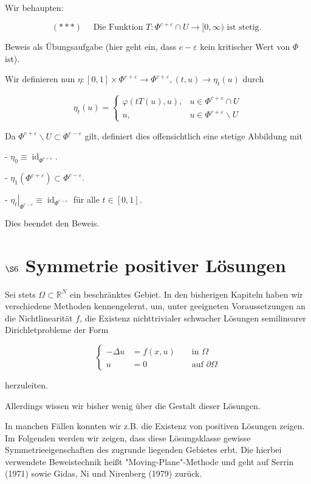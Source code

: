 \documentclass[10pt, letterpaper]{article}
\begin{document}
Wir behaupten:

$$
(* * *) \quad \text { Die Funktion } T: \Phi^{c+\varepsilon} \cap U \rightarrow[0, \infty) \text { ist stetig. }
$$

Beweis als Übungsaufgabe (hier geht ein, dass $c-\varepsilon$ kein kritischer Wert von $\Phi$ ist).

Wir definieren nun $\eta:[0,1] \times \Phi^{c+\varepsilon} \rightarrow \Phi^{c+\varepsilon},(t, u) \rightarrow \eta_{t}(u)$ durch

$$
\eta_{t}(u)= \begin{cases}\varphi(t T(u), u), & u \in \Phi^{c+\varepsilon} \cap U \\ u, & u \in \Phi^{c+\varepsilon} \backslash U\end{cases}
$$

Da $\Phi^{c+\varepsilon} \backslash U \subset \Phi^{c-\varepsilon}$ gilt, definiert dies offensichtlich eine stetige Abbildung mit

- $\eta_{0} \equiv \operatorname{id}_{\Phi^{c+\varepsilon}}$.

- $\eta_{1}\left(\Phi^{c+\varepsilon}\right) \subset \Phi^{c-\varepsilon}$.

- $\left.\eta_{t}\right|_{\Phi^{c-\varepsilon}} \equiv \operatorname{id}_{\Phi^{c-\varepsilon}}$ für alle $t \in[0,1]$.

Dies beendet den Beweis.

\section*{$\S 6$ Symmetrie positiver Lösungen}

Sei stets $\Omega \subset \mathbb{R}^{N}$ ein beschränktes Gebiet. In den bisherigen Kapiteln haben wir verschiedene Methoden kennengelernt, um, unter geeigneten Voraussetzungen an die Nichtlinearität $f$, die Existenz nichttrivialer schwacher Lösungen semilinearer Dirichletprobleme der Form

$$
\left\{\begin{aligned}
-\Delta u & =f(x, u) & & \text { in } \Omega \\
u & =0 & & \text { auf } \partial \Omega
\end{aligned}\right.
$$

herzuleiten.

Allerdings wissen wir bisher wenig über die Gestalt dieser Lösungen.

In manchen Fällen konnten wir z.B. die Existenz von positiven Lösungen zeigen. Im Folgenden werden wir zeigen, dass diese Lösungsklasse gewisse Symmetrieeigenschaften des zugrunde liegenden Gebietes erbt. Die hierbei verwendete Beweistechnik heißt "Moving-Plane"-Methode und geht auf Serrin (1971) sowie Gidas, Ni und Nirenberg (1979) zurück.
\end{document}

